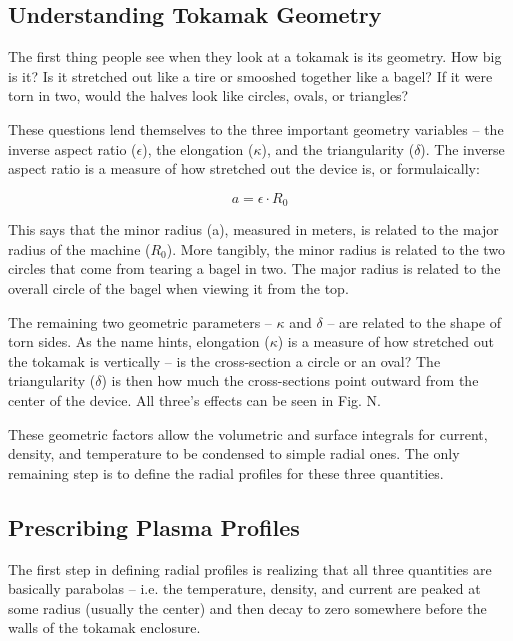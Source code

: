 \documentclass[11pt]{book}
\begin{document}
\subsection{Understanding Tokamak Geometry}

The first thing people see when they look at a tokamak is its geometry. How big is it? Is it stretched out like a tire or smooshed together like a bagel? If it were torn in two, would the halves look like circles, ovals, or triangles?

These questions lend themselves to the three important geometry variables -- the inverse aspect ratio ($\epsilon$), the elongation ($\kappa$), and the triangularity ($\delta$). The inverse aspect ratio is a measure of how stretched out the device is, or formulaically:

\begin{equation}
	\label{eq:a}
	a = \epsilon \cdot R_0
\end{equation}

This says that the minor radius (a), measured in meters, is related to the major radius of the machine ($R_0$). More tangibly, the minor radius is related to the two circles that come from tearing a bagel in two. The major radius is related to the overall circle of the bagel when viewing it from the top.

The remaining two geometric parameters -- $\kappa$ and $\delta$ -- are related to the shape of torn sides. As the name hints, elongation ($\kappa$) is a measure of how stretched out the tokamak is vertically -- is the cross-section a circle or an oval? The triangularity ($\delta$) is then how much the cross-sections point outward from the center of the device. All three's effects can be seen in Fig. N.

These geometric factors allow the volumetric and surface integrals for current, density, and temperature to be condensed to simple radial ones. The only remaining step is to define the radial profiles for these three quantities.

\subsection{Prescribing Plasma Profiles}

The first step in defining radial profiles is realizing that all three quantities are basically parabolas -- i.e. the temperature, density, and current are peaked at some radius (usually the center) and then decay to zero somewhere before the walls of the tokamak enclosure.
\end{document}
